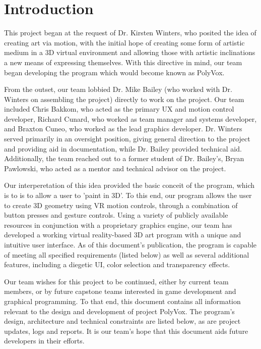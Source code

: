 \documentclass[onecolumn, draftclsnofoot,10pt, compsoc]{IEEEtran}
\begin{document}
\newpage
{}
\tableofcontents
\clearpage





\section{Introduction}
This project began at the request of Dr. Kirsten Winters, who posited the idea of creating art via motion, with the initial hope of creating some form of artistic medium in a 3D virtual environment and allowing those with artistic inclinations a new means of expressing themselves. With this directive in mind, our team began developing the program which would become known as PolyVox.

From the outset, our team lobbied Dr. Mike Bailey (who worked with Dr. Winters on assembling the project) directly to work on the project. Our team included Chris Bakkom, who acted as the primary UX and motion control developer, Richard Cunard, who worked as team manager and systems developer, and Braxton Cuneo, who worked as the lead graphics developer. Dr. Winters served primarily in an oversight position, giving general direction to the project and providing aid in documentation, while Dr. Bailey provided technical aid. Additionally, the team reached out to a former student of Dr. Bailey's, Bryan Pawlowski, who acted as a mentor and technical advisor on the project.

Our interperetation of this idea provided the basic conceit of the program, which is to is to allow a user to 'paint in 3D'. To this end, our program allows the user to create 3D geometry using VR motion controls, through a combination of button presses and gesture controls. Using a variety of publicly available resources in conjunction with a proprietary graphics engine, our team has developed a working virtual reality-based 3D art program with a unique and intuitive user interface. As of this document's publication, the program is capable of meeting all specified requirements (listed below) as well as several additional features, including a diegetic UI, color selection and transparency effects.

Our team wishes for this project to be continued, either by current team members, or by future capstone teams interested in game development and graphical programming. To that end, this document contains all information relevant to the design and development of project PolyVox. The program's design, architecture and technical constraints are listed below, as are project updates, logs and reports. It is our team's hope that this document aids future developers in their efforts.
\end{document}

